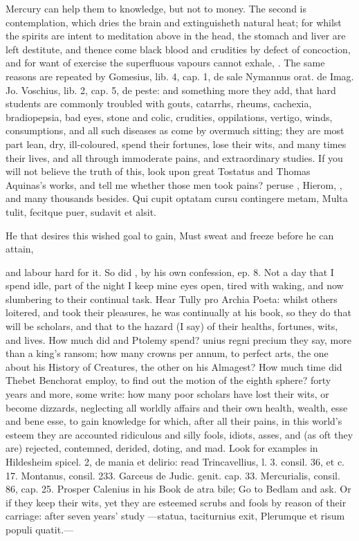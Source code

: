 {{Mercury can help them to knowledge, but not to money. The second is
contemplation, which dries the brain and extinguisheth natural
heat; for whilst the spirits are intent to meditation above in the
head, the stomach and liver are left destitute, and thence come black
blood and crudities by defect of concoction, and for want of exercise
the superfluous vapours cannot exhale, \etc{}. The same reasons are
repeated by Gomesius, lib. 4, cap. 1, de sale Nymannus orat. de
Imag. Jo. Voschius, lib. 2, cap. 5, de peste: and something more they
add, that hard students are commonly troubled with gouts, catarrhs,
rheums, cachexia, bradiopepsia, bad eyes, stone and colic,
crudities, oppilations, vertigo, winds, consumptions, and all
such diseases as come by overmuch sitting; they are most part lean,
dry, ill-coloured, spend their fortunes, lose their wits, and many
times their lives, and all through immoderate pains, and extraordinary
studies. If you will not believe the truth of this, look upon great
Tostatus and Thomas Aquinas's works, and tell me whether those men took
pains? peruse \Austin{}, Hierom, \etc{}, and many thousands besides.
Qui cupit optatam cursu contingere metam,
Multa tulit, fecitque puer, sudavit et alsit.

He that desires this wished goal to gain,
Must sweat and freeze before he can attain,

and labour hard for it. So did \Seneca, by his own confession, ep. 8.
Not a day that I spend idle, part of the night I keep mine eyes
open, tired with waking, and now slumbering to their continual task.
Hear Tully pro Archia Poeta: whilst others loitered, and took their
pleasures, he was continually at his book, so they do that will be
scholars, and that to the hazard (I say) of their healths, fortunes,
wits, and lives. How much did \Aristotle and Ptolemy spend? unius regni
precium they say, more than a king's ransom; how many crowns per annum,
to perfect arts, the one about his History of Creatures, the other on
his Almagest? How much time did Thebet Benchorat employ, to find out
the motion of the eighth sphere? forty years and more, some write: how
many poor scholars have lost their wits, or become dizzards, neglecting
all worldly affairs and their own health, wealth, esse and bene esse,
to gain knowledge for which, after all their pains, in this world's
esteem they are accounted ridiculous and silly fools, idiots, asses,
and (as oft they are) rejected, contemned, derided, doting, and mad.
Look for examples in Hildesheim spicel. 2, de mania et delirio: read
Trincavellius, l. 3. consil. 36, et c. 17. Montanus, consil. 233.
Garceus de Judic. genit. cap. 33. Mercurialis, consil. 86, cap.
25. Prosper Calenius in his Book de atra bile; Go to Bedlam and
ask. Or if they keep their wits, yet they are esteemed scrubs and fools
by reason of their carriage: after seven years' study
---statua, taciturnius exit,
Plerumque et risum populi quatit.---

}}

